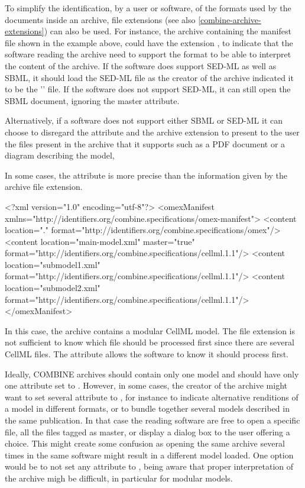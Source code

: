 To simplify the identification, by a user or software, of the formats used by the documents inside an archive, file extensions 
(see also \ref{combine-archive-extensions}) can also be used. For instance, the archive containing the manifest file shown in the example above, could have the extension , to indicate that the software reading the archive need
to support the  format to be able to interpret the content of the archive. If the software
does support SED-ML as well as SBML, it should load the SED-ML file as the creator of the archive indicated
it to be the '' file. If the software does not support SED-ML, it can still open the SBML document, ignoring
the master attribute.

Alternatively, if a software does not support either SBML or SED-ML it can choose to disregard the  attribute and the archive extension to present to the user the files present in the archive that it supports such as a PDF document or a diagram describing the model, 

In some cases, the  attribute is more precise than the information given by the archive file
extension.


\begin{example}
<?xml version="1.0" encoding="utf-8"?>
<omexManifest xmlns="http://identifiers.org/combine.specifications/omex-manifest">
    <content location="." 
        format="http://identifiers.org/combine.specifications/omex"/>
    <content location="main-model.xml" master="true"
        format="http://identifiers.org/combine.specifications/cellml.1.1"/>
    <content location="submodel1.xml" 
        format="http://identifiers.org/combine.specifications/cellml.1.1"/>
    <content location="submodel2.xml" 
        format="http://identifiers.org/combine.specifications/cellml.1.1"/>
</omexManifest>
\end{example}

In this case, the archive contains a modular CellML model. The file extension  is not sufficient to know which file should be processed first since there are several CellML files. The  attribute allows the software
to know it should process  first.

Ideally, COMBINE archives should contain only one model and should have only one  attribute set to . However, in some cases, the creator of the archive might want to set several  attribute to , for instance to indicate alternative renditions of a model in different formats, or to bundle together several models described in the same publication. In that case the reading software are free to open a specific file, all the files tagged as master, or display a dialog box to the user offering a choice. This might create some confusion as opening the same archive several times in the same software might result in a different model loaded. One option would be to not set any  attribute to , being aware that proper interpretation of the archive migh be difficult, in particular for modular models.  


